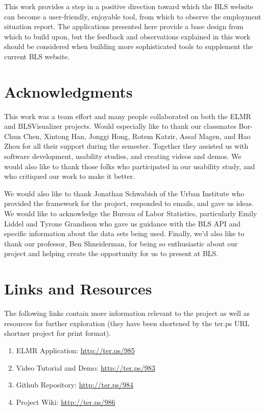 \documentclass{sigchi}
\begin{document}
This work provides a step in a positive direction toward which the BLS website can become a user-friendly, enjoyable tool, from which to observe the employment situation report. The applications presented here provide a base design from which to build upon, but the feedback and observations explained in this work should be considered when building more sophisticated tools to supplement the current BLS website.


\section{Acknowledgments}

This work was a team effort and many people collaborated on both the ELMR and BLSVisualizer projects. Would especially like to thank our classmates Bor-Chun Chen, Xintong Han, Jonggi Hong, Rotem Katzir, Assaf Magen, and Hao Zhou for all their support during the semester. Together they assisted us with software development, usability studies, and creating videos and demos. We would also like to thank those folks who participated in our usability study, and who critiqued our work to make it better.

We would also like to thank Jonathan Schwabish of the Urban Institute who provided the framework for the project, responded to emails, and gave us ideas. We would like to acknowledge the Bureau of Labor Statistics, particularly Emily Liddel and Tyrone Grandison who gave us guidance with the BLS API and specific information about the data sets being used. Finally, we'd also like to thank our professor, Ben Shneiderman, for being so enthusiastic about our project and helping create the opportunity for us to present at BLS.

\section{Links and Resources}

The following links contain more information relevant to the project as well as resources for further exploration (they have been shortened by the ter.ps URL shortner project for print format).

\begin{enumerate}
    \item ELMR Application: \url{http://ter.ps/985}
    \item Video Tutorial and Demo: \url{http://ter.ps/983}
    \item Github Repository: \url{http://ter.ps/984}
    \item Project Wiki: \url{http://ter.ps/986}
\end{enumerate}

\balance{}



\end{document}
